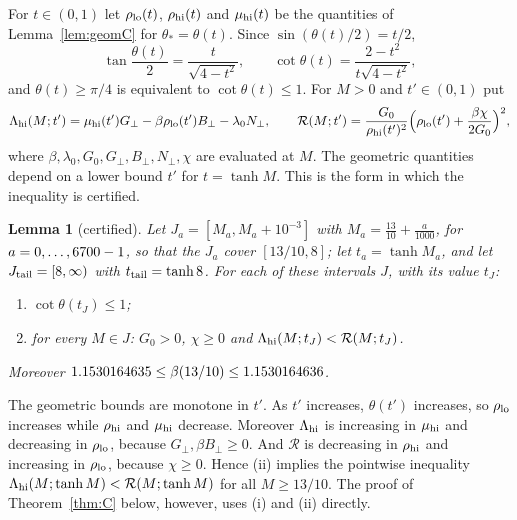 \documentclass[11pt]{article}
\newtheorem{lemma}[theorem]{Lemma}
\theoremstyle{remark}
\newcommand{\Gp}{G_{\perp}}
\newcommand{\Bp}{B_{\perp}}
\newcommand{\Np}{N_{\perp}}
\begin{document}
For $t\in(0,1)$ let $\rho_{\rm lo}(t)$, $\rho_{\rm hi}(t)$ and $\mu_{\rm hi}(t)$ be the quantities of
Lemma~\ref{lem:geomC} for $\theta_*=\theta(t)$. Since $\sin(\theta(t)/2)=t/2$,
\begin{equation}\label{eq:geomt}
  \tan\frac{\theta(t)}2=\frac{t}{\sqrt{4-t^2}},\qquad \cot\theta(t)=\frac{2-t^2}{t\sqrt{4-t^2}} ,
\end{equation}
and $\theta(t)\ge\pi/4$ is equivalent to $\cot\theta(t)\le1$. For $M>0$ and $t'\in(0,1)$ put
\begin{equation}\label{eq:Lhi}
  \Lambda_{\rm hi}(M;t')=\mu_{\rm hi}(t')\Gp-\beta\rho_{\rm lo}(t')\Bp-\lambda_0\Np,\qquad
  \mathcal R(M;t')=\frac{G_0}{\rho_{\rm hi}(t')^2}\Bigl(\rho_{\rm lo}(t')+\frac{\beta\chi}{2G_0}\Bigr)^2 ,
\end{equation}
where $\beta,\lambda_0,G_0,\Gp,\Bp,\Np,\chi$ are evaluated at $M$. The geometric quantities depend on a
lower bound $t'$ for $t=\tanh M$. This is the form in which the inequality is certified.

\begin{lemma}[certified]\label{lem:certC}
Let $J_a=[M_a,M_a+10^{-3}]$ with $M_a=\frac{13}{10}+\frac a{1000}$, for $a=0,\dots,6700-1$, so that
the $J_a$ cover $[13/10,8]$; let $t_a=\tanh M_a$, and let $J_{\rm tail}=[8,\infty)$ with
$t_{\rm tail}=\tanh 8$. For each of these intervals $J$, with its value $t_J$:
\begin{enumerate}
\item[(i)] $\cot\theta(t_J)\le1$;
\item[(ii)] for every $M\in J$: $G_0>0$, $\chi\ge0$ and $\Lambda_{\rm hi}(M;t_J)<\mathcal R(M;t_J)$.
\end{enumerate}
Moreover $1.1530164635\le\beta(13/10)\le1.1530164636$.
\end{lemma}

The geometric bounds are monotone in $t'$. As $t'$ increases, $\theta(t')$ increases, so $\rho_{\rm lo}$
increases while $\rho_{\rm hi}$ and $\mu_{\rm hi}$ decrease. Moreover $\Lambda_{\rm hi}$ is increasing in
$\mu_{\rm hi}$ and decreasing in $\rho_{\rm lo}$, because $\Gp,\beta \Bp\ge0$. And $\mathcal R$ is decreasing
in $\rho_{\rm hi}$ and increasing in $\rho_{\rm lo}$, because $\chi\ge0$. Hence (ii) implies the pointwise
inequality $\Lambda_{\rm hi}(M;\tanh M)<\mathcal R(M;\tanh M)$ for all $M\ge13/10$. The proof of
Theorem~\ref{thm:C} below, however, uses (i) and (ii) directly.
\end{document}

